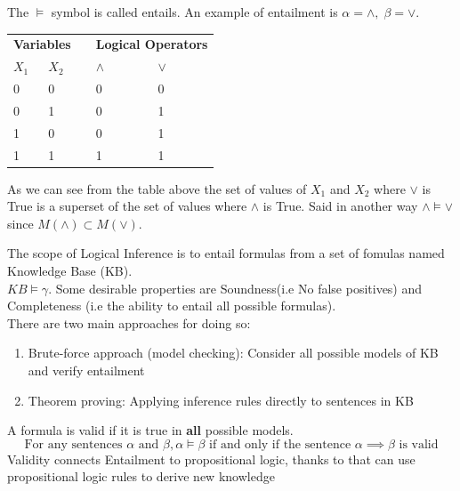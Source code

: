 The $\models$ symbol is called entails. An example of entailment is $\alpha=\land,\; \beta=\lor$.

\begin{table}[H]
    \centering
    \begin{tabular}{lllll}
    \multicolumn{2}{c}{{\textbf{Variables}}} &  & \multicolumn{2}{l}{\textbf{Logical Operators}} \\
    $X_1$ & $X_2$ &  & $\land$ & $\lor$ \\
    0        & 0       &  & 0       & 0      \\
    0        & 1       &  & 0       & 1      \\
    1        & 0       &  & 0       & 1      \\
    1        & 1       &  & 1       & 1     
    \end{tabular}
\end{table}
As we can see from the table above the set of values of $X_1$ 
and $X_2$ where $\lor$ is True is a superset of the set of values 
where $\land$ is True.
Said in another way $\land\models\lor$ since $M(\land)\subset M(\lor)$.

The scope of Logical Inference is to entail formulas from a set of fomulas named Knowledge Base (KB). \\
$KB\models \gamma$.
Some desirable properties are Soundness(i.e No false positives) and Completeness (i.e the ability to entail all possible formulas).\\

There are two main approaches for doing so:
\begin{enumerate}
    \item Brute-force approach (model checking): Consider all possible models of KB and verify entailment
    \item Theorem proving: Applying inference rules directly to sentences in KB
\end{enumerate}

\begin{tcolorbox}[colback=red!5!white,colframe=red!75!black,title=\textbf{Validity Definition}]
A formula is valid if it is true in \textbf{all} possible models.
    \begin{equation*}
        \text{For any sentences } \alpha \text{ and } \beta, \alpha \models \beta \text{ if and only if the sentence }\alpha\implies\beta \text{ is valid}
    \end{equation*}
    Validity connects Entailment to propositional logic, thanks to that can use propositional logic rules to derive new knowledge
\end{tcolorbox}

